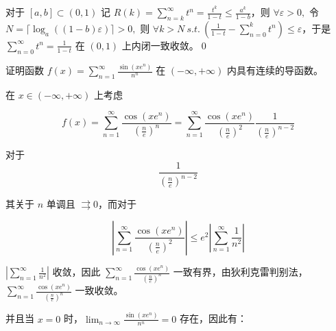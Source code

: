 对于 $\displaystyle [ a,b] \subset ( 0,1)$ 记 $\displaystyle R( k) =\sum _{n=k}^{\infty } t^{n} =\frac{t^{k}}{1-t} \leqslant \frac{a^{k}}{1-b}$，则 $\displaystyle \forall \varepsilon  >0,$ 令 $\displaystyle N=\lceil \log_{a}(( 1-b) \varepsilon ) \rceil  >0,$ 则 $\displaystyle \forall k >N\ s.t.\ \left(\frac{1}{1-t} -\sum _{n=0}^{k} t^{n}\right) \leqslant \varepsilon $，于是 $\displaystyle \sum _{n=0}^{\infty } t^{n} =\frac{1}{1-t}$ 在 $\displaystyle ( 0,1)$ 上内闭一致收敛。\qed 







\begin{ques}
	证明函数 $\displaystyle f( x) =\sum _{n=1}^{\infty }\frac{\sin\left( xe^{n}\right)}{n^{n}}$ 在 $\displaystyle ( -\infty ,+\infty )$ 内具有连续的导函数。
\end{ques}



在 $\displaystyle x\in ( -\infty ,+\infty )$ 上考虑


\begin{equation*}
f( x) =\sum _{n=1}^{\infty }\frac{\cos\left( xe^{n}\right)}{\left(\frac{n}{e}\right)^{n}} =\sum _{n=1}^{\infty }\frac{\cos\left( xe^{n}\right)}{\left(\frac{n}{e}\right)^{2}}\frac{1}{\left(\frac{n}{e}\right)^{n-2}}
\end{equation*}


对于 
\begin{equation*}
\frac{1}{\left(\frac{n}{e}\right)^{n-2}}
\end{equation*}


其关于 $\displaystyle n$ 单调且 $\displaystyle \rightrightarrows 0$，而对于


\begin{equation*}
\left| \sum _{n=1}^{\infty }\frac{\cos\left( xe^{n}\right)}{\left(\frac{n}{e}\right)^{2}}\right| \leqslant e^{2}\left| \sum _{n=1}^{\infty }\frac{1}{n^{2}}\right| 
\end{equation*}


$\displaystyle \left| \sum _{n=1}^{\infty }\frac{1}{n^{2}}\right| $ 收敛，因此 $\displaystyle \sum _{n=1}^{\infty }\frac{\cos\left( xe^{n}\right)}{\left(\frac{n}{e}\right)^{n}}$ 一致有界，由狄利克雷判别法，$\displaystyle \sum _{n=1}^{\infty }\frac{\cos\left( xe^{n}\right)}{\left(\frac{n}{e}\right)^{n}}$ 一致收敛。

并且当 $\displaystyle x=0$ 时，$\displaystyle \lim _{n\rightarrow \infty }\frac{\sin\left( xe^{n}\right)}{n^{n}} =0$ 存在，因此有：


